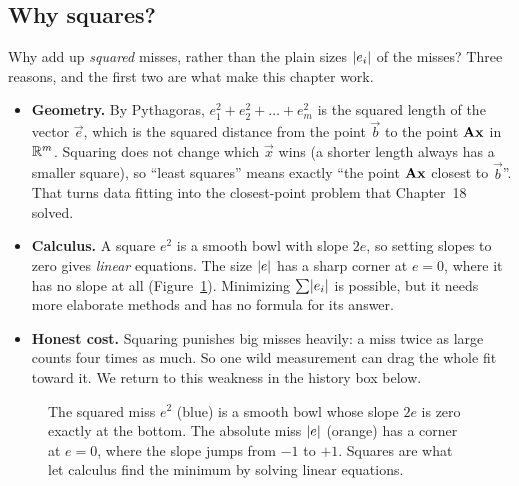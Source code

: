\subsection*{Why squares?}

Why add up \emph{squared} misses, rather than the plain sizes $\lvert e_i\rvert$ of the misses? Three
reasons, and the first two are what make this chapter work.
\begin{itemize}
  \item \textbf{Geometry.} By Pythagoras, $e_1^2+e_2^2+\dots+e_m^2$ is the squared length of the
        vector $\vec{e}$, which is the squared distance from the point $\vec{b}$ to the point
        $\mathbf{A}\mathbf{x}$ in $\mathbb{R}^m$. Squaring does not change which $\vec{x}$ wins (a shorter
        length always has a smaller square), so ``least squares'' means exactly ``the point
        $\mathbf{A}\mathbf{x}$ closest to $\vec{b}$''. That turns data fitting into the closest-point
        problem that Chapter~18 solved.
  \item \textbf{Calculus.} A square $e^2$ is a smooth bowl with slope $2e$, so setting slopes to
        zero gives \emph{linear} equations. The size $\lvert e\rvert$ has a sharp corner at $e=0$, where
        it has no slope at all (Figure~\ref{ch19:abs-vs-square}). Minimizing $\sum\lvert e_i\rvert$ is
        possible, but it needs more elaborate methods and has no formula for its answer.
  \item \textbf{Honest cost.} Squaring punishes big misses heavily: a miss twice as large counts
        four times as much. So one wild measurement can drag the whole fit toward it. We return to
        this weakness in the history box below.
\end{itemize}

\begin{figure}[htbp]
\centering
{}
\caption{The squared miss $e^2$ (blue) is a smooth bowl whose slope $2e$ is zero exactly at the
bottom. The absolute miss $\lvert e\rvert$ (orange) has a corner at $e=0$, where the slope jumps from
$-1$ to $+1$. Squares are what let calculus find the minimum by solving linear equations.}
\label{ch19:abs-vs-square}
\end{figure}


